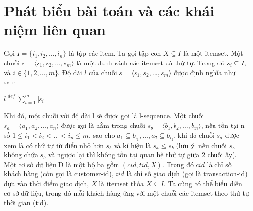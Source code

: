 \documentclass[a4paper 14pt]{article}
\begin{document}
	\section{Phát biểu bài toán và các khái niệm liên quan}
		Gọi $I = \{i_1, i_2, \hdots, i_n\}$ là tập các item.
		Ta gọi tập con $X \subseteq I$ là một itemset.
		Một chuỗi $s = \langle s_1, s_2, \hdots, s_m \rangle$ là một danh sách các itemset có thứ tự. Trong đó $s_i \subseteq I$, và $i \in \{1,2,\hdots,m\}$.
		Độ dài $l$ của chuỗi $s = \langle s_1, s_2, \hdots, s_m \rangle$ được định nghĩa như sau:\\
		\begin{center}
		$l \overset{def}{=} \sum\limits_{i = 1}^{m}|s_i|$\\
		\end{center}
		Khi đó, một chuỗi với độ dài l sẽ được gọi là l-sequence. Một chuỗi $s_a = \langle a_1, a_2, \hdots, a_n \rangle$ được gọi là nằm trong chuỗi $s_b = \langle b_1, b_2, \hdots, b_m \rangle$, nếu tồn tại n số $1 \leq i_1 < i_2 < \hdots < i_n \leq m$, sao cho $a_1 \subseteq b_{i_1}, \hdots, a_2 \subseteq b_{i_2}$, khi đó chuỗi $s_a$ được xem là có thứ tự từ điển nhỏ hơn $s_b$ và kí hiệu là $s_a \leq s_b$ (lưu ý: nếu chuỗi $s_a$ không chứa $s_b$ và ngược lại thì không tồn tại quan hệ thứ tự giữa 2 chuỗi ấy).\\
		Một cơ sở dữ liệu D là một bộ ba gồm $(cid,tid,X)$. Trong đó $cid$ là chỉ số khách hàng (còn gọi là customer-id), $tid$ là chỉ số giao dịch (gọi là transaction-id) dựa vào thời điểm giao dịch, $X$ là itemset thỏa $X \subseteq I$. Ta cũng có thể biểu diễn cơ sở dữ liệu, trong đó mỗi khách hàng ứng với một chuỗi các itemset theo thứ tự thời gian (tid).\\
\end{document}

